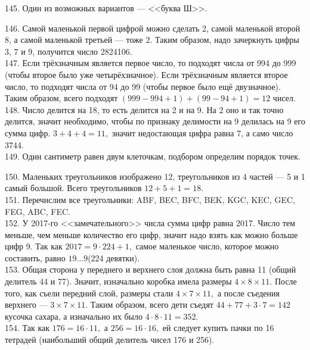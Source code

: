 145. Один из возможных вариантов --- <<буква Ш>>.
\begin{center}
\begin{figure}[ht!]
\end{figure}
\end{center}
146. Самой маленькой первой цифрой можно сделать 2, самой маленькой второй 8, а самой маленькой третьей --- тоже 2. Таким образом, надо зачеркнуть цифры 3, 7 и 9, получится число 2824106.\\
147. Если трёхзначным является первое число, то подходят числа от 994 до 999 (чтобы второе было уже четырёхзначное). Если трёхзначным является второе число, то подходят числа от 94 до 99 (чтобы первое было ещё двузначное). Таким образом, всего подходят $(999-994+1)+(99-94+1)=12$ чисел.\\
148. Число делится на 18, то есть делится на 2 и на 9. На 2 оно и так точно делится, значит необходимо, чтобы по признаку делимости на 9 делилась на 9 его сумма цифр. $3+4+4=11,$ значит недостающая цифра равна 7, а само число 3744.\\
149. Один сантиметр равен двум клеточкам, подбором определим порядок точек.
\begin{center}
\begin{figure}[ht!]
\end{figure}
\end{center}
150. Маленьких треугольников изображено 12, треугольников из 4 частей --- 5 и 1 самый большой. Всего треугольников $12+5+1=18.$\\
151. Перечислим все треугольники: ABF, BEC, BFC, BEK, KGC, KEC, GEC, FEG, ABC, FEC.\\
152. У 2017-го <<замечательного>> числа сумма цифр равна 2017. Число тем меньше, чем меньше количество его цифр, значит надо взять как можно больше цифр 9. Так как
$2017=9\cdot224+1,$ самое маленькое число, которое можно составить, равно $19\ldots9$(224 девятки).\\
153. Общая сторона у переднего и верхнего слоя должна быть равна 11 (общий делитель 44 и 77). Значит, изначально коробка имела размеры $4\times8\times11.$ После того, как съели передний слой, размеры стали $4\times7\times11,$ а после съедения верхнего --- $3\times7\times11.$ Таким образом, всего дети съедят $44+77+3\cdot7=142$ кусочка сахара, а изначально их было $4\cdot8\cdot11=352.$\\
154. Так как $176=16\cdot11,$ а $256=16\cdot16,$ ей следует купить пачки по 16 тетрадей (наибольший общий делитель чисел 176 и 256).\\
